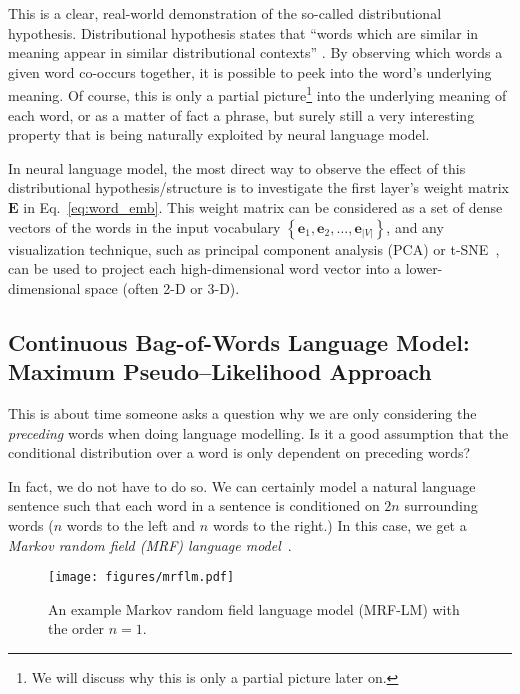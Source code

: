 \documentclass{report}
\newcommand{\vect}[1]{\mathbf{#1}}
\newcommand{\matr}[1]{\mathbf{#1}}
\newcommand{\ve}[0]{\vect{e}}
\newcommand{\mE}[0]{\matr{E}}
\begin{document}
This is a clear, real-world demonstration of the so-called distributional
hypothesis. Distributional hypothesis states that ``words which are similar in
meaning appear in similar distributional contexts'' \cite{firth1957}. By
observing which words a given word co-occurs together, it is possible to peek
into the word's underlying meaning. Of course, this is only a partial
picture\footnote{
    We will discuss why this is only a partial picture later on.
}
into the underlying meaning of each word, or as a matter of fact a phrase, but
surely still a very interesting property that is being naturally exploited by
neural language model.

In neural language model, the most direct way to observe the effect of this
distributional hypothesis/structure is to investigate the first layer's weight
matrix $\mE$ in Eq.~\eqref{eq:word_emb}. This weight matrix can be considered as
a set of dense vectors of the words in the input vocabulary $\left\{ \ve_1,
\ve_2, \ldots, \ve_{|V|}\right\}$, and any visualization technique, such as
principal component analysis (PCA) or t-SNE~\cite{VanDerMaaten08}, can be used
to project each high-dimensional word vector into a lower-dimensional space
(often 2-D or 3-D). 


\subsection{Continuous Bag-of-Words Language Model: \\ Maximum Pseudo--Likelihood
Approach}
\label{sec:cbow}

This is about time someone asks a question why we are only considering the {\em
preceding} words when doing language modelling. Is it a good assumption that the
conditional distribution over a word is only dependent on preceding words? 

In fact, we do not have to do so. We can certainly model a natural language
sentence such that each word in a sentence is conditioned on $2n$ surrounding
words ($n$ words to the left and $n$ words to the right.) In this case, we get a
{\em Markov random field (MRF) language model}~\cite{jernite2015fast}.

\begin{figure}[ht]
    \centering
    \texttt{[image: figures/mrflm.pdf]}
    \caption{An example Markov random field language model (MRF-LM) with the
    order $n=1$.}
    \label{fig:mrf_lm}
\end{figure}
\end{document}
